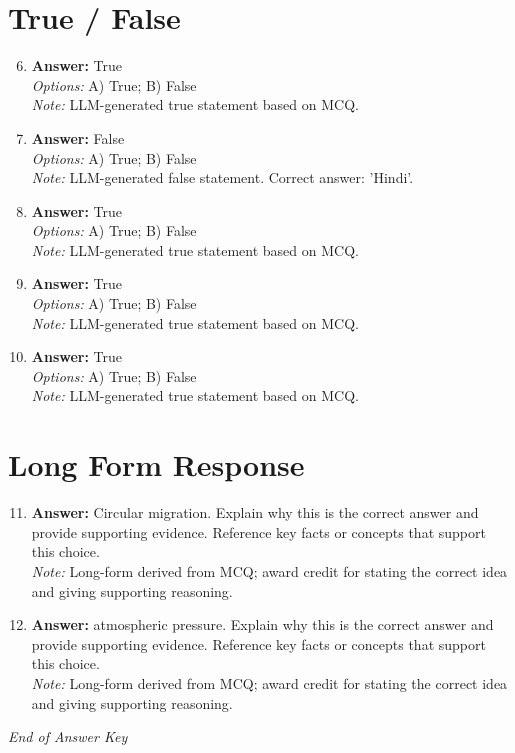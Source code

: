 \documentclass[12pt]{article}
\begin{document}
\section*{True / False}
\begin{enumerate}[label=\arabic*.]
\setcounter{enumi}{5}
\item \textbf{Answer:} True
\\ \textit{Options:} A) True; B) False
\\ \textit{Note:} LLM-generated true statement based on MCQ.
\item \textbf{Answer:} False
\\ \textit{Options:} A) True; B) False
\\ \textit{Note:} LLM-generated false statement. Correct answer: 'Hindi'.
\item \textbf{Answer:} True
\\ \textit{Options:} A) True; B) False
\\ \textit{Note:} LLM-generated true statement based on MCQ.
\item \textbf{Answer:} True
\\ \textit{Options:} A) True; B) False
\\ \textit{Note:} LLM-generated true statement based on MCQ.
\item \textbf{Answer:} True
\\ \textit{Options:} A) True; B) False
\\ \textit{Note:} LLM-generated true statement based on MCQ.
\end{enumerate}

\section*{Long Form Response}
\begin{enumerate}[label=\arabic*.]
\setcounter{enumi}{10}
\item \textbf{Answer:} Circular migration. Explain why this is the correct answer and provide supporting evidence. Reference key facts or concepts that support this choice.
\\ \textit{Note:} Long-form derived from MCQ; award credit for stating the correct idea and giving supporting reasoning.
\item \textbf{Answer:} atmospheric pressure. Explain why this is the correct answer and provide supporting evidence. Reference key facts or concepts that support this choice.
\\ \textit{Note:} Long-form derived from MCQ; award credit for stating the correct idea and giving supporting reasoning.
\end{enumerate}

\vfill
\noindent\textit{End of Answer Key}
\end{document}
